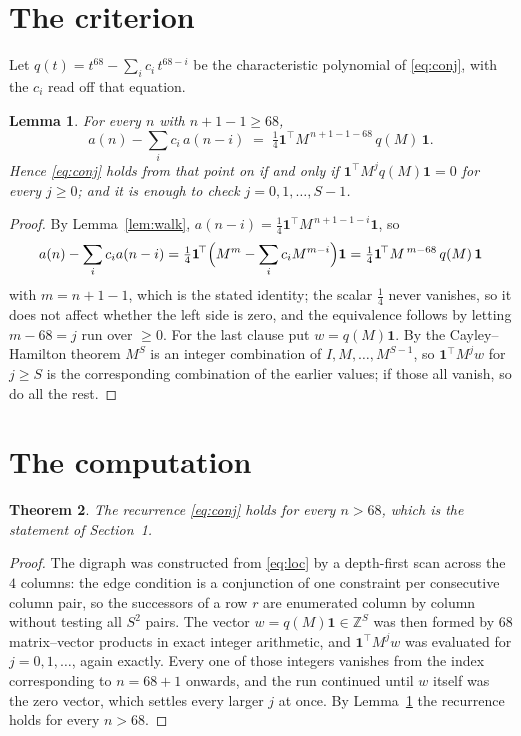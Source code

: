 \documentclass[11pt,a4paper]{article}
\theoremstyle{plain}
\newtheorem{theorem}{Theorem}
\newtheorem{lemma}[theorem]{Lemma}
\theoremstyle{definition}
\begin{document}
\section{The criterion}

Let $q(t)=t^{68}-\sum_i c_i\,t^{68-i}$ be the characteristic polynomial of
\eqref{eq:conj}, with the $c_i$ read off that equation.

\begin{lemma}\label{lem:crit}
For every $n$ with $n+1-1\ge68$,
\[
a(n)-\sum_i c_i\,a(n-i)\;=\;\tfrac1{4}\mathbf{1}^{\!\top}M^{\,n+1-1-68}\,q(M)\,\mathbf{1} .
\]
Hence \eqref{eq:conj} holds from that point on if and only if
$\mathbf{1}^{\!\top}M^{j}q(M)\mathbf{1}=0$ for every $j\ge0$; and it is enough to check
$j=0,1,\dots,S-1$.
\end{lemma}

\begin{proof}
By Lemma~\ref{lem:walk}, $a(n-i)=\tfrac1{4}\mathbf{1}^{\!\top}M^{\,n+1-1-i}\mathbf{1}$, so
\[
a(n)-\sum_i c_i a(n-i)
=\tfrac1{4}\mathbf{1}^{\!\top}\Bigl(M^{m}-\sum_i c_i M^{m-i}\Bigr)\mathbf{1}
=\tfrac1{4}\mathbf{1}^{\!\top}M^{\,m-68}\,q(M)\,\mathbf{1}
\]
with $m=n+1-1$, which is the stated identity; the scalar $\tfrac1{4}$ never vanishes, so it does not affect whether the left side is zero, and the equivalence follows by letting
$m-68=j$ run over $\ge0$. For the last clause put $w=q(M)\mathbf{1}$. By the
Cayley--Hamilton theorem $M^{S}$ is an integer combination of $I,M,\dots,M^{S-1}$, so
$\mathbf{1}^{\!\top}M^{j}w$ for $j\ge S$ is the corresponding combination of the earlier
values; if those all vanish, so do all the rest.
\end{proof}

\section{The computation}

\begin{theorem}
The recurrence \eqref{eq:conj} holds for every $n>68$, which is the statement of
Section~1.
\end{theorem}

\begin{proof}
The digraph was constructed from \eqref{eq:loc} by a depth-first scan across the $4$
columns: the edge condition is a conjunction of one constraint per consecutive column
pair, so the successors of a row $r$ are enumerated column by column without testing all
$S^2$ pairs. The vector $w=q(M)\mathbf{1}\in\mathbb{Z}^{S}$ was then formed by $68$
matrix--vector products in exact integer arithmetic, and $\mathbf{1}^{\!\top}M^{j}w$ was
evaluated for $j=0,1,\dots$, again exactly. Every one of those integers vanishes from the
index corresponding to $n=68+1$ onwards, and the run continued until $w$ itself was the
zero vector, which settles every larger $j$ at once. By Lemma~\ref{lem:crit} the recurrence
holds for every $n>68$.
\end{proof}
\end{document}
